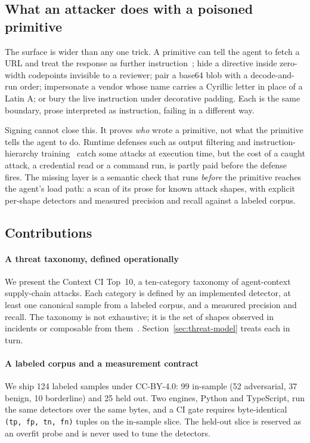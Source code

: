 \subsection{What an attacker does with a poisoned primitive}

The surface is wider than any one trick. A primitive can tell the agent
to fetch a URL and treat the response as further
instruction~\cite{primitivehub:2026:top10}; hide a directive inside
zero-width codepoints invisible to a reviewer; pair a base64 blob with
a decode-and-run order; impersonate a vendor whose name carries a
Cyrillic letter in place of a Latin A; or bury the live instruction
under decorative padding. Each is the same boundary, prose interpreted
as instruction, failing in a different way.

Signing cannot close this. It proves \emph{who} wrote a primitive, not
what the primitive tells the agent to do. Runtime defenses such as
output filtering and instruction-hierarchy
training~\cite{Wallace:2024:instruction-hierarchy,Greshake:2023:prompt-injection-survey}
catch some attacks at execution time, but the cost of a caught attack,
a credential read or a command run, is partly paid before the defense
fires. The missing layer is a semantic check that runs \emph{before} the
primitive reaches the agent's load path: a scan of its prose for known
attack shapes, with explicit per-shape detectors and measured precision
and recall against a labeled corpus.

\subsection{Contributions}

\paragraph{A threat taxonomy, defined operationally} We present the
Context CI Top~10, a ten-category taxonomy of agent-context
supply-chain attacks. Each category is defined by an implemented
detector, at least one canonical sample from a labeled corpus, and a
measured precision and recall. The taxonomy is not exhaustive; it is the
set of shapes observed in incidents or composable from
them~\cite{Greshake:2023:prompt-injection-survey,Shai-Hulud:2025:npm-worm,Carlini:2024:webcrawl-poisoning}.
Section~\ref{sec:threat-model} treats each in turn.

\paragraph{A labeled corpus and a measurement contract} We ship 124
labeled samples under CC-BY-4.0: 99 in-sample (52 adversarial, 37
benign, 10 borderline) and 25 held out. Two engines, Python and
TypeScript, run the same detectors over the same bytes, and a CI gate
requires byte-identical \texttt{(tp, fp, tn, fn)} tuples on the
in-sample slice. The held-out slice is reserved as an overfit probe and
is never used to tune the detectors.

